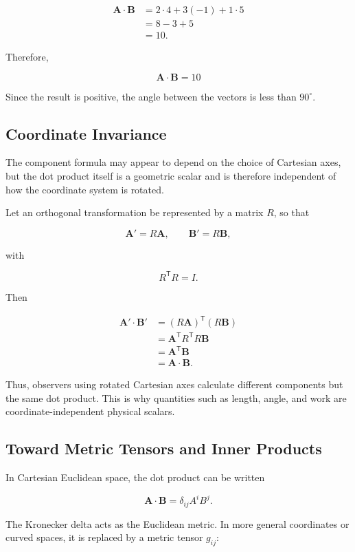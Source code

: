 \begin{align*}
\mathbf A\cdot\mathbf B
&=2\cdot4+3(-1)+1\cdot5\\
&=8-3+5\\
&=10.
\end{align*}

Therefore,

\[
\boxed{
\mathbf A\cdot\mathbf B=10
}
\]

Since the result is positive, the angle between the vectors is less than
$90^{\circ}$.

\subsection{Coordinate Invariance}

The component formula may appear to depend on the choice of Cartesian axes, but
the dot product itself is a geometric scalar and is therefore independent of
how the coordinate system is rotated.

Let an orthogonal transformation be represented by a matrix $R$, so that

\[
\mathbf A'=R\mathbf A,
\qquad
\mathbf B'=R\mathbf B,
\]

with

\[
R^{\mathsf T}R=I.
\]

Then

\begin{align*}
\mathbf A'\cdot\mathbf B'
&=(R\mathbf A)^{\mathsf T}(R\mathbf B)\\
&=\mathbf A^{\mathsf T}R^{\mathsf T}R\mathbf B\\
&=\mathbf A^{\mathsf T}\mathbf B\\
&=\mathbf A\cdot\mathbf B.
\end{align*}

Thus, observers using rotated Cartesian axes calculate different components but
the same dot product. This is why quantities such as length, angle, and work are
coordinate-independent physical scalars.

\subsection{Toward Metric Tensors and Inner Products}

In Cartesian Euclidean space, the dot product can be written

\[
\mathbf A\cdot\mathbf B
=
\delta_{ij}A^iB^j.
\]

The Kronecker delta acts as the Euclidean metric. In more general coordinates or
curved spaces, it is replaced by a metric tensor $g_{ij}$:

